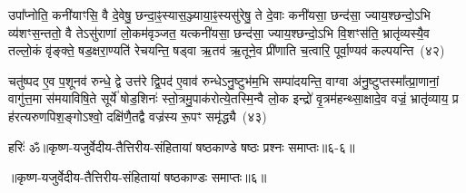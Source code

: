 उपा᳚प्नोति॒ कनी॑याꣳसि॒ वै दे॒वेषु॒ छन्दा॒ꣴ॒स्यास॒ञ्ज्याया॒ꣴ॒स्यसु॑रेषु॒ ते दे॒वाः कनी॑यसा॒ छन्द॑सा॒ ज्याय॒श्छन्दो॒\-ऽभि व्य॑शꣳस॒न्ततो॒ वै ते\-ऽसु॑राणां लो॒कम॑वृञ्जत॒ यत्कनी॑यसा॒ छन्द॑सा॒ ज्याय॒श्छन्दो॒\-ऽभि वि॒शꣳस॑ति॒ भ्रातृ॑व्यस्यै॒व तल्लो॒कं वृ॑ङ्क्ते॒ षड॒क्षरा॒ण्यति॑ रेचयन्ति॒ षड्वा ऋ॒तव॑ ऋ॒तूने॒व प्री॑णाति च॒त्वारि॒ पूर्वा॒ण्यव॑ कल्पयन्ति~(४२)\ip

चतु॑ष्पद ए॒व प॒शूनव॑ रुन्धे॒ द्वे उत्त॑रे द्वि॒पद॑ ए॒वाव॑ रुन्धे\-ऽनु॒ष्टुभ॑म॒भि सम्पा॑दयन्ति॒ वाग्वा अ॑नु॒ष्टुप्तस्मा᳚त्प्रा॒णानां॒ वागु॑त्त॒मा स॑मयाविषि॒ते सूर्ये॑ षोड॒शिनः॑ स्तो॒त्रमु॒पाक॑रोत्ये॒तस्मि॒न्वै लो॒क इन्द्रो॑ वृ॒त्रम॑हन्थ्सा॒क्षादे॒व वज्रं॒ भ्रातृ॑व्याय॒ प्र ह॑रत्यरुणपिश॒ङ्गो\-ऽश्वो॒ दक्षि॑णै॒तद्वै वज्र॑स्य रू॒पꣳ समृ॑द्ध्यै~(४३)\ip


{}%

{हरिः॑ ॐ}{॥कृष्ण-यजुर्वेदीय-तैत्तिरीय-संहितायां षष्ठकाण्डे षष्ठः प्रश्नः समाप्तः॥६-६॥}

\centerline{॥कृष्ण-यजुर्वेदीय-तैत्तिरीय-संहितायां षष्ठकाण्डः समाप्तः॥६॥}

\medskip

\centerline{\hyperref[sec:startkanda6]{\closesection}}



\kandaend


